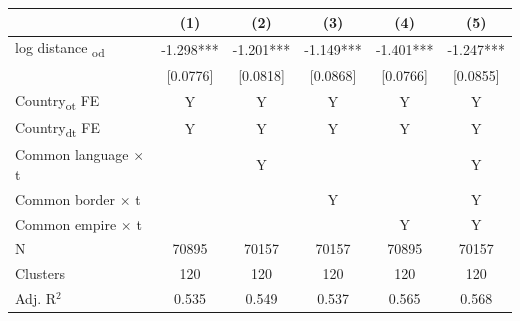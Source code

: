 {
\def\sym#1{\ifmmode^{#1}\else\(^{#1}\)\fi}
\begin{tabular}{l*{5}{c}}
\toprule
            &\multicolumn{1}{c}{(1)}   &\multicolumn{1}{c}{(2)}   &\multicolumn{1}{c}{(3)}   &\multicolumn{1}{c}{(4)}   &\multicolumn{1}{c}{(5)}   \\
\midrule
log distance \textsubscript{od}&      -1.298***&      -1.201***&      -1.149***&      -1.401***&      -1.247***\\
            &    [0.0776]   &    [0.0818]   &    [0.0868]   &    [0.0766]   &    [0.0855]   \\\hline
Country\textsubscript{ot} FE&           Y   &           Y   &           Y   &           Y   &           Y   \\
Country\textsubscript{dt} FE&           Y   &           Y   &           Y   &           Y   &           Y   \\
Common language $\times$ t&               &           Y   &               &               &           Y   \\
Common border $\times$ t&               &               &           Y   &               &           Y   \\
Common empire $\times$ t&               &               &               &           Y   &           Y   \\
\midrule
N           &       70895   &       70157   &       70157   &       70895   &       70157   \\
Clusters    &         120   &         120   &         120   &         120   &         120   \\
Adj. R{$^2$}&       0.535   &       0.549   &       0.537   &       0.565   &       0.568   \\
\bottomrule
\end{tabular}
}
